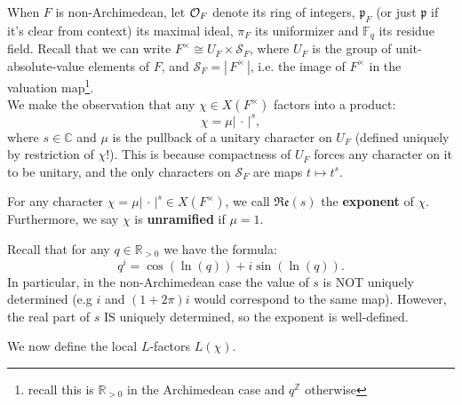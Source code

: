 \documentclass[11pt, x11names]{article}
\newcommand{\zz}{\mathbb{Z}}
\newcommand{\rr}{\mathbb{R}}
\newcommand{\cc}{\mathbb{C}}
\newcommand{\ff}{\mathbb{F}}
\newcommand{\pp}{\mathfrak{p}}
\newcommand{\cals}{\mathcal{S}}
\newcommand{\abs}[1]{\left| \, #1  \,\right|}
\newcommand{\re}[1]{\mathfrak{Re} \left( #1 \right)}
\begin{document}
When $F$ is non-Archimedean, let $\mathcal{O}_F$ denote its ring of integers, $\pp_F$ (or just $\pp$ if it's clear from context) its maximal ideal, $\pi_F$ its uniformizer and $\ff_q$ its residue field. Recall that we can write $F^\times \cong U_F \times \cals_F$, where $U_F$ is the group of unit-absolute-value elements of $F$, and $\cals_F = \abs{F^\times}$, i.e. the image of $F^\times$ in the valuation map\footnote{recall this is $\rr_{> 0}$ in the Archimedean case and $q^\zz$ otherwise}.\\
We make the observation that any $\chi \in X(F^\times)$ factors into a product:
\begin{equation*}
    \chi = \mu \abs{\cdot}^s,
\end{equation*}
where $s \in \cc$ and $\mu$ is the pullback of a unitary character on $U_F$ (defined uniquely by restriction of $\chi$!). This is because compactness of $U_F$ forces any character on it to be unitary, and the only characters on $\cals_F$ are maps $t \mapsto t^s$.
\begin{defn}
    For any character $\chi = \mu \abs{\cdot}^s \in X(F^\times)$, we call $\re{s}$ the \textbf{exponent} of $\chi$.\\
    Furthermore, we say $\chi$ is \textbf{unramified} if $\mu = 1$.
\end{defn}
\begin{warning}
    Recall that for any $q \in \rr_{> 0}$ we have the formula:
    \begin{equation*}
        q^i = \cos(\ln(q)) + i \sin(\ln(q)).
    \end{equation*}
    In particular, in the non-Archimedean case the value of $s$ is NOT uniquely determined (e.g $i$ and $(1 + 2\pi)i$ would correspond to the same map). However, the real part of $s$ IS uniquely determined, so the exponent is well-defined.
\end{warning}

We now define the local $L$-factors $L(\chi)$.
\end{document}
